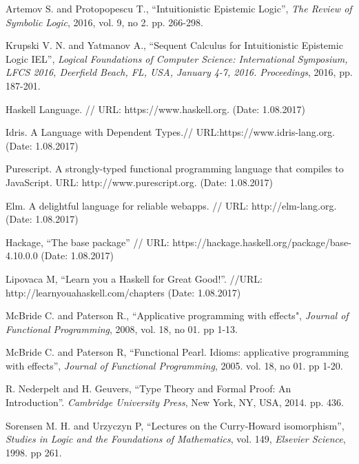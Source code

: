 
\begin{thebibliography}{}

 Artemov S. and Protopopescu T., \/ ``Intuitionistic Epistemic Logic'', \textit{The
Review of Symbolic Logic}, 2016, vol. 9, no 2. pp. 266-298.\parskip=1mm

 Krupski V. N. and Yatmanov A., \/ ``Sequent Calculus for Intuitionistic Epistemic Logic
IEL'', \textit{Logical Foundations of Computer Science: International Symposium, LFCS 2016, Deerfield
Beach, FL, USA, January 4-7, 2016. Proceedings}, 2016, pp. 187-201.\parskip=1mm

 Haskell Language. // URL: https://www.haskell.org. (Date: 1.08.2017) \parskip=1mm

 Idris. A Language with Dependent Types.// URL:https://www.idris-lang.org. (Date:
1.08.2017) \parskip=1mm

 Purescript. A strongly-typed functional programming language that compiles to JavaScript.
URL: http://www.purescript.org. (Date: 1.08.2017) \parskip=1mm

 Elm. A delightful language for reliable webapps. // URL: http://elm-lang.org. (Date:
1.08.2017) \parskip=1mm

 Hackage, \/ ``The base package'' // URL: https://hackage.haskell.org/package/base-4.10.0.0
(Date: 1.08.2017) \parskip=1mm

 Lipovaca M, \/ ``Learn you a Haskell for Great Good!''. //URL:
http://learnyouahaskell.com/chapters (Date: 1.08.2017) \parskip=1mm

 McBride C. and Paterson R., ``Applicative programming with effects", \textit{Journal of
Functional Programming}, 2008, vol. 18, no 01. pp 1-13. \parskip=1mm

 McBride C. and Paterson R, ``Functional Pearl. Idioms: applicative programming with
effects'', \textit{Journal of Functional Programming}, 2005. vol. 18, no 01. pp 1-20. \parskip=1mm

 R. Nederpelt and H. Geuvers, ``Type Theory and Formal Proof: An Introduction''.
\textit{Cambridge University Press}, New York, NY, USA, 2014. pp. 436. \parskip=1mm

 Sorensen M. H. and Urzyczyn P, ``Lectures on the Curry-Howard isomorphism'',
\textit{Studies in Logic and the Foundations of Mathematics}, vol. 149, \textit{Elsevier Science}, 1998.
pp 261. \parskip=1mm


\end{thebibliography}
